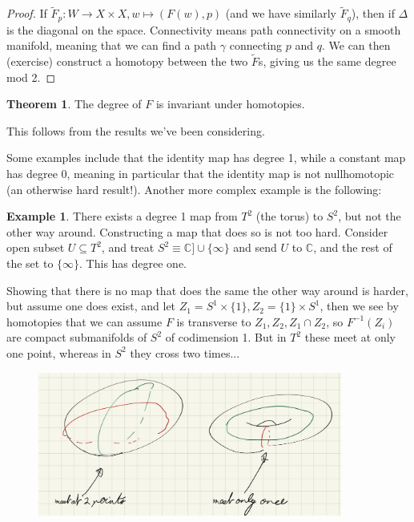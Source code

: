 \documentclass{article}
\theoremstyle{definition}
\newtheorem{theorem}{Theorem}
\newtheorem{example}{Example}
\begin{document}
\begin{proof}
  If $\tilde{F}_p : W \to X \times X, w \mapsto (F(w), p) $ (and we have
  similarly $\tilde{F}_q$), then if $\Delta$ is the diagonal on the space.
  Connectivity means path connectivity on a smooth manifold, meaning that we can
  find a path $\gamma$ connecting $p$ and $q.$ We can then (exercise) construct
  a homotopy between the two $\tilde{F}$s, giving us the same degree mod 2.
\end{proof}

\begin{theorem}
The degree of $F$ is invariant under homotopies.
\end{theorem}

This follows from the results we've been considering.

Some examples include that the identity map has degree 1, while a constant map
has degree 0, meaning in particular that the identity map is not nullhomotopic
(an otherwise hard result!). Another more complex example is the following:

\begin{example}
There exists a degree 1 map from $T^2$ (the torus) to $S^2$, but not the other
way around. Constructing a map that does so is not too hard. Consider open
subset $U \subseteq T^2$, and treat $S^2 \equiv \mathbb{C] \cup \{\infty\}}$ and
send $U$ to $\mathbb{C}$, and the rest of the set to $\{\infty\}$. This has
degree one.

Showing that there is no map that does the same the other way around is harder,
but assume one does exist, and let $Z_1 = S^1 \times \{1\}, Z_2 = \{1\} \times
S^1$, then we see by homotopies that we can assume $F$ is transverse to $Z_1,
Z_2, Z_1 \cap Z_2$, so $F^{-1}(Z_i)$ are compact submanifolds of $S^2$ of
codimension 1. But in $T^2$ these meet at only one point, whereas in $S^2$ they
cross two times...
\end{example}

\begin{figure}[H]
\centering
\includegraphics[width=10cm]{res/DG/DG14_torus_sphere.jpg}
\end{figure}
\end{document}
